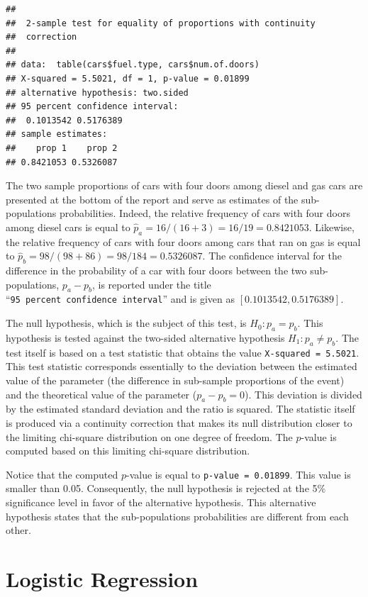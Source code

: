 \documentclass[
]{krantz}
\theoremstyle{definition}
\theoremstyle{definition}
\theoremstyle{definition}
\theoremstyle{remark}
\begin{document}
\begin{verbatim}
## 
##  2-sample test for equality of proportions with continuity
##  correction
## 
## data:  table(cars$fuel.type, cars$num.of.doors)
## X-squared = 5.5021, df = 1, p-value = 0.01899
## alternative hypothesis: two.sided
## 95 percent confidence interval:
##  0.1013542 0.5176389
## sample estimates:
##    prop 1    prop 2 
## 0.8421053 0.5326087
\end{verbatim}

The two sample proportions of cars with four doors among diesel and gas
cars are presented at the bottom of the report and serve as estimates of
the sub-populations probabilities. Indeed, the relative frequency of
cars with four doors among diesel cars is equal to
\(\hat p_a = 16/(16+3) = 16/19 = 0.8421053\). Likewise, the relative
frequency of cars with four doors among cars that ran on gas is equal to
\(\hat p_b = 98/(98+86) = 98/184 = 0.5326087\). The confidence interval
for the difference in the probability of a car with four doors between
the two sub-populations, \(p_a - p_b\), is reported under the title
``\texttt{95\ percent\ confidence\ interval}'' and is given as
\([0.1013542, 0.5176389]\).

The null hypothesis, which is the subject of this test, is
\(H_0: p_a = p_b\). This hypothesis is tested against the two-sided
alternative hypothesis \(H_1: p_a \not = p_b\). The test itself is based
on a test statistic that obtains the value \texttt{X-squared\ =\ 5.5021}. This
test statistic corresponds essentially to the deviation between the
estimated value of the parameter (the difference in sub-sample
proportions of the event) and the theoretical value of the parameter
(\(p_a - p_b = 0\)). This deviation is divided by the estimated standard
deviation and the ratio is squared. The statistic itself is produced via
a continuity correction that makes its null distribution closer to the
limiting chi-square distribution on one degree of freedom. The \(p\)-value
is computed based on this limiting chi-square distribution.

Notice that the computed \(p\)-value is equal to \texttt{p-value\ =\ 0.01899}. This
value is smaller than 0.05. Consequently, the null hypothesis is
rejected at the 5\% significance level in favor of the alternative
hypothesis. This alternative hypothesis states that the sub-populations
probabilities are different from each other.

\hypertarget{logistic-regression}{%
\section{Logistic Regression}\label{logistic-regression}}
\end{document}
